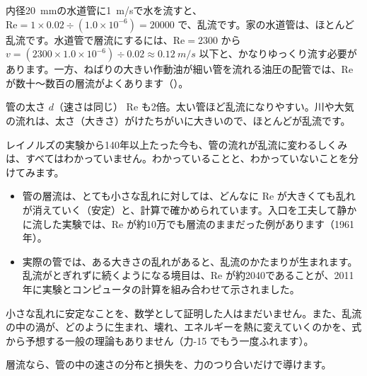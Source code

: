 \begin{phmijika}
内径\qty{20}{mm}の水道管に\qty{1}{m/s}で水を流すと、$\mathrm{Re}=1\times0.02\div (1.0\times10^{-6})=\num{20000}$ で、乱流です。家の水道管は、ほとんど乱流です。水道管で層流にするには、$\mathrm{Re}=2300$ から $v=(2300\times1.0\times10^{-6})\div 0.02\approx\qty{0.12}{m/s}$ 以下と、かなりゆっくり流す必要があります。一方、ねばりの大きい作動油が細い管を流れる油圧の配管では、Re が数十〜数百の層流がよくあります（\nobreak{}\nobreak）。
\end{phmijika}

\begin{phbaisuru}{管の太さ $d$（速さは同じ）}
Re も2倍。太い管ほど乱流になりやすい。川や大気の流れは、太さ（大きさ）がけたちがいに大きいので、ほとんどが乱流です。
\end{phbaisuru}

\begin{phmada}
レイノルズの実験から140年以上たった今も、管の流れが乱流に変わるしくみは、すべてはわかっていません。わかっていることと、わかっていないことを分けてみます。
\begin{itemize}[leftmargin=1.2\zw, itemsep=1pt, topsep=1pt, label={\color{phMada}●}]
\item 管の層流は、とても小さな乱れに対しては、どんなに Re が大きくても乱れが消えていく（安定）と、計算で確かめられています。入口を工夫して静かに流した実験では、Re が約10万でも層流のままだった例があります（1961年）。
\item 実際の管では、ある大きさの乱れがあると、乱流のかたまりが生まれます。乱流がとぎれずに続くようになる境目は、Re が約2040であることが、2011年に実験とコンピュータの計算を組み合わせて示されました。
\end{itemize}
小さな乱れに安定なことを、数学として証明した人はまだいません。また、乱流の中の渦が、どのように生まれ、壊れ、エネルギーを熱に変えていくのかを、式から予想する一般の理論もありません（力-15 でもう一度ふれます）。
\end{phmada}

\label{ph:力-14:sec8}層流なら、管の中の速さの分布と損失を、力のつり合いだけで導けます。

\begin{phmodel}[円い管の中の層流]
\end{phmodel}

